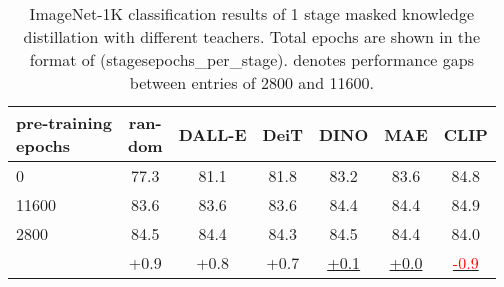 \documentclass[10pt,twocolumn,letterpaper]{article}
\begin{document}
\begin{table}[t]
	\begin{center}
	    \setlength{\tabcolsep}{1.0mm}
        \begin{tabular}{l|ccccc|c}
            \makecell[l]{pre-training\\epochs} & \makecell[c]{ran-\\dom} & \makecell[c]{DALL-E\\\cite{dall-e}} & \makecell[c]{DeiT\\\cite{deit}} & \makecell[c]{DINO\\\cite{dino}} & \makecell[c]{MAE\\\cite{mae}} & \makecell[c]{CLIP\\\cite{clip}} \\
            \hline
            0 & 77.3 & 81.1 & 81.8 & 83.2 & 83.6 & 84.8 \\
            11600 & 83.6 & 83.6 & 83.6 & 84.4  & 84.4 & 84.9 \\
            2800 & 84.5 & 84.4 & 84.3 & 84.5 & 84.4 & 84.0 \\
            \hline
             & \textcolor{mgreen}{+0.9} & \textcolor{mgreen}{+0.8} & \textcolor{mgreen}{+0.7} & \underline{\textcolor{mgreen}{+0.1}} &  \underline{\textcolor{mgreen}{+0.0}} & \underline{\textcolor{red}{-0.9}}\\
        \end{tabular}
        \end{center}
    \caption{ImageNet-1K classification results of 1 stage masked knowledge distillation with different teachers. Total epochs are shown in the format of (stagesepochs\_per\_stage).  denotes performance gaps between entries of 2800 and 11600. 
    }
    \label{tab:app:one stage}
\end{table}
\end{document}
